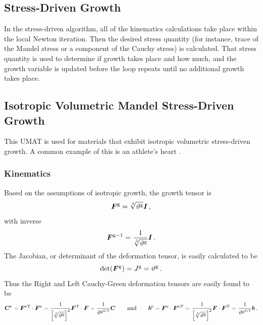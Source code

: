 \documentclass[10pt,letterpaper,oneside]{report}
\newcommand{\ten}[1]{\mbox{\boldmath $#1$}{}}
\newcommand{\scas}[1]{\mbox{{\scriptsize{${\rm{#1}}$}}}{}}
\begin{document}
\begin{itemize}
\section{Stress-Driven Growth}

In the stress-driven algorithm, all of the kinematics calculations take place within the local Newton iteration.  Then the desired stress quantity (for instance, trace of the Mandel stress or a component of the Cauchy stress) is calculated.  That stress quantity is used to determine if growth takes place and how much, and the growth variable is updated before the loop repeats until no additional growth takes place.  

\subsection{Isotropic Volumetric Mandel Stress-Driven Growth}
This UMAT is used for materials that exhibit isotropic volumetric stress-driven growth.  A common example of this is an athlete's heart \cite{Goktepe2010}.

\subsubsection{Kinematics}
Based on the assumptions of isotropic growth, the growth tensor is
\begin{equation}
\ten{F}^{\scas{g}} = \sqrt[3]{\vartheta^{\scas{g}}} \ten{I} \, , 
\end{equation}
with inverse
\begin{equation}
\ten{F}^{\scas{g}-1} = \frac{1}{\sqrt[3]{\vartheta^{\scas{g}}}} \ten{I} \, . 
\end{equation}
The Jacobian, or determinant of the deformation tensor, is easily calculated to be 
\begin{equation}
\det (\ten{F}^{\scas{g}}) = J^{\scas{g}} = \vartheta^{\scas{g}} \, .
\end{equation}
Thus the Right and Left Cauchy-Green deformation tensors are easily found to be 
\begin{equation}
\ten{C}^{\scas{e}} = \ten{F}^{\scas{eT}} \cdot \ten{F}^{\scas{e}} = \frac{1}{ \left[ \sqrt[3]{\vartheta^{\scas{g}}} \right]^2} \ten{F} ^{\scas{T}} \cdot \ten{F} = \frac{1}{\vartheta^{\scas{g}^{2/3}}} \ten{C}
\qquad \mbox{and} \qquad
\ten{b}^{\scas{e}} = \ten{F}^{\scas{e}} \cdot \ten{F}^{\scas{eT}} = \frac{1}{ \left[ \sqrt[3]{\vartheta^{\scas{g}}} \right]^2} \ten{F} \cdot \ten{F} ^{\scas{T}} = \frac{1}{\vartheta^{\scas{g}^{2/3}}} \ten{b} \, . 
\end{equation}


\end{itemize}
\end{document}
